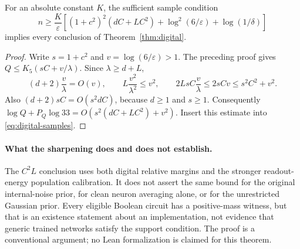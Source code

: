 \begin{corollary}
\label{cor:digital-polynomial}
For an absolute constant $K$, the sufficient sample condition
\begin{equation}\label{eq:digital-clean-envelope}
 n\ge\frac K\varepsilon\left[
 (1+c^2)^2(dC+LC^2)+\log^2(6/\varepsilon)+\log(1/\delta)\right]
\end{equation}
implies every conclusion of Theorem~\ref{thm:digital}.
\end{corollary}
\begin{proof}
Write $s=1+c^2$ and $v=\log(6/\varepsilon)>1$.  The preceding proof gives
$Q\le K_5(sC+v/\lambda)$.  Since $\lambda\ge d+L$,
\[
 (d+2)\frac v\lambda=O(v),\qquad
 L\frac{v^2}{\lambda^2}\le v^2,\qquad
 2LsC\frac v\lambda\le2sCv\le s^2C^2+v^2.
\]
Also $(d+2)sC=O(s^2dC)$, because $d\ge1$ and $s\ge1$.
Consequently
$\log Q+P_Q\log33=O(s^2(dC+LC^2)+v^2)$.
Insert this estimate into \eqref{eq:digital-samples}.
\end{proof}

\paragraph{What the sharpening does and does not establish.}
The $C^2L$ conclusion uses both digital relative margins and the stronger
readout-energy population calibration.  It does not assert the same bound
for the original internal-noise prior, for clean neuron averaging alone,
or for the unrestricted Gaussian prior.  Every eligible Boolean circuit
has a positive-mass witness, but that is an existence statement about an
implementation, not evidence that generic trained networks satisfy the
support condition.  The proof is a conventional argument; no Lean
formalization is claimed for this theorem.

